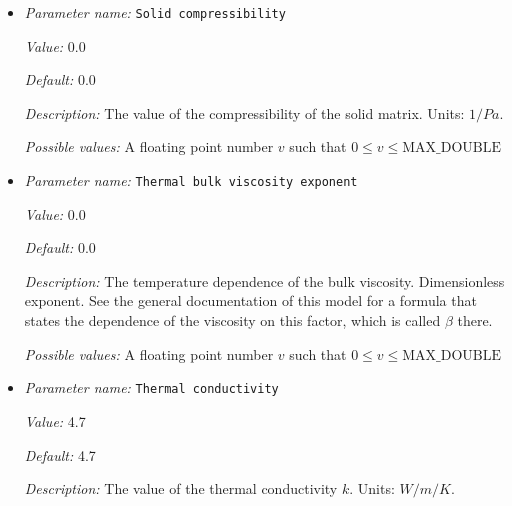 \begin{itemize}
{\it Value:} 293


{\it Default:} 293


{\it Description:} The reference temperature $T_0$. The reference temperature is used in both the density and viscosity formulas. Units: $K$.


{\it Possible values:} A floating point number $v$ such that $0 \leq v \leq \text{MAX\_DOUBLE}$
\item {\it Parameter name:} {\tt Solid compressibility}
\label{parameters:Material model/Melt simple/Solid compressibility}


{\it Value:} 0.0


{\it Default:} 0.0


{\it Description:} The value of the compressibility of the solid matrix. Units: $1/Pa$.


{\it Possible values:} A floating point number $v$ such that $0 \leq v \leq \text{MAX\_DOUBLE}$
\item {\it Parameter name:} {\tt Thermal bulk viscosity exponent}
\label{parameters:Material model/Melt simple/Thermal bulk viscosity exponent}


{\it Value:} 0.0


{\it Default:} 0.0


{\it Description:} The temperature dependence of the bulk viscosity. Dimensionless exponent. See the general documentation of this model for a formula that states the dependence of the viscosity on this factor, which is called $\beta$ there.


{\it Possible values:} A floating point number $v$ such that $0 \leq v \leq \text{MAX\_DOUBLE}$
\item {\it Parameter name:} {\tt Thermal conductivity}
\label{parameters:Material model/Melt simple/Thermal conductivity}


{\it Value:} 4.7


{\it Default:} 4.7


{\it Description:} The value of the thermal conductivity $k$. Units: $W/m/K$.



\end{itemize}
